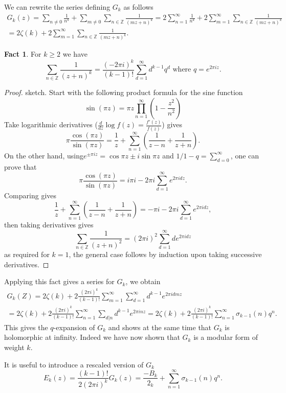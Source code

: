 \documentclass{article}
\theoremstyle{definition}
\newtheorem*{fact}{Fact}
\begin{document}
We can rewrite the series defining $G_k$ as follows
\begin{multline*}
G_k(z) = \sum_{n\ne 0}\frac{1}{n^k} + \sum_{m\ne 0}\sum_{n\in\mathbb{Z}}\frac{1}{(mz+n)^k} = 2\sum_{n=1}^{\infty}\frac{1}{n^k} + 2 \sum_{m=1}^{\infty}\sum_{n\in\mathbb{Z}}\frac{1}{(mz+n)^k} \\
= 2\zeta(k) + 2\sum_{m=1}^{\infty}\sum_{n\in\mathbb{Z}}\frac{1}{(mz+n)^k}.\end{multline*}

\begin{fact}
For $k\ge 2$ we have
\[\sum_{n\in\mathbb{Z}}\frac{1}{(z+n)^k} = \frac{(-2\pi i)^k}{(k-1)!}\sum_{d=1}^{\infty}d^{k-1}q^d\text{ where } q= e^{2\pi i z}.\]
\end{fact}

\begin{proof} sketch.
Start with the following product formula for the sine function
\[\sin(\pi z) = \pi z\prod_{n=1}^{\infty}\left(1-\frac{z^2}{n^2}\right)\]
Take logarithmic derivatives ($\frac{d}{dz}\log f(z) = \frac{f'(z)}{f(z)}$) gives
\[\pi \frac{\cos(\pi z)}{\sin(\pi z)} = \frac{1}{z} + \sum_{n=1}^{\infty}\left(\frac{1}{z-n}+ \frac{1}{z+n}\right).\]
On the other hand, using$e^{\pm \pi i z} = \cos\pi z\pm i\sin \pi z$ and $1/1-q = \sum_{d=0}^{\infty}$, one can prove that 
\[\pi\frac{\cos(\pi z)}{\sin(\pi z)} = i\pi i - 2\pi i \sum_{d=1}^{\infty}e^{2 \pi i dz}.\]
Comparing gives
\[\frac{1}{z} + \sum_{n=1}^{\infty}\left(\frac{1}{z-n} + \frac{1}{z+n}\right) = -\pi i -2\pi i\sum_{d=1}^{\infty}e^{2\pi i d z},\]
then taking derivatives gives
\[\sum_{n\in\mathbb{Z}} \frac{1}{(z+n)^2} = (2\pi i)^2\sum_{d=1}^{\infty}de^{2\pi i dz}\]
as required for $k=1$, the general case follows by induction upon taking successive derivatives.
\end{proof}

Applying this fact gives a series for $G_k$, we obtain
\begin{multline*}
G_k(Z) = 2\zeta(k) + 2\frac{(2\pi i)^k}{(k-1)!}\sum_{m=1}^{\infty}\sum_{d=1}^{\infty}d^{k-1}e^{2 \pi i d m z} \\
= 2\zeta(k) + 2\frac{(2\pi i)^k}{(k-1)!}\sum_{n=1}^\infty\sum_{d|n}d^{k-1}e^{2\pi i n z} =2\zeta(k) + 2\frac{(2\pi i)^k}{(k-1)!}\sum_{n=1}^\infty \sigma_{k-1}(n)q^n.\end{multline*}
This gives the $q$-expansion of $G_k$ and shows at the same time that $G_k$ is holomorphic at infinity.
Indeed we have now shown that $G_k$ is a modular form of weight $k$.

It is useful to introduce a rescaled version of $G_k$
\[E_k(z) = \frac{(k-1)!}{2(2\pi i)^k}G_k(z) = \frac{-B_k}{2_k} + \sum_{n=1}^{\infty}\sigma_{k-1}(n)q^n.\]
\end{document}
